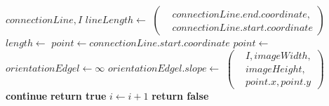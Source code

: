 \begin{algorithm}[!ht]\small
\caption{}
\label{alg:isconnectionlinebridged}
\begin{algorithmic}[1]
	\Require $\mathit{connectionLine},I$
	\State $\mathit{lineLength} \gets$ 
	$\left(
	\begin{aligned}
		& \mathit{connectionLine.end.coordinate},\\
		& \mathit{connectionLine.start.coordinate}
	\end{aligned}\right)$
	\label{alg:isconnectionlinebridged-length-start}
	\State $\mathit{length} \gets$ 
	\State $\mathit{point} \gets \mathit{connectionLine.start.coordinate}$
	\label{alg:isconnectionlinebridged-length-end}
	\label{alg:isconnectionlinebridged-loop-start}
		\State $\mathit{point} \gets$ 
		\State $\mathit{orientationEdgel} \gets \infty$
		\State $\mathit{orientationEdgel.slope} \gets$ 
		$\left(
		\begin{aligned}
			& I,\mathit{imageWidth},\\
			& \mathit{imageHeight},\\
			& \mathit{point.x}, \mathit{point.y}
		\end{aligned}\right)$
		\label{alg:isconnectionlinebridged-gradient}
		\label{alg:isconnectionlinebridged-iscompatible}
			\State \textbf{continue}
		\EndIf
		\State \textbf{return true}
		\label{alg:isconnectionlinebridged-bridged}
		\State $i \gets i + 1$
	\EndFor
	\label{alg:isconnectionlinebridged-loop-end}
	\State \textbf{return false}
	\label{alg:isconnectionlinebridged-notbridged}
\end{algorithmic}
\end{algorithm}
